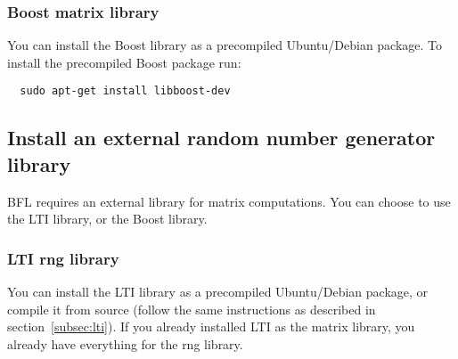 \documentclass[a4paper,10pt]{article}
\begin{document}
\subsubsection{Boost matrix library}
You can install the Boost library as a precompiled Ubuntu/Debian
package. To install the precompiled Boost package run:
\begin{verbatim}
  sudo apt-get install libboost-dev
\end{verbatim}








\subsection{Install an external random number generator library}
BFL requires an external library for matrix computations. You can
choose to use the LTI library, or the Boost library.

\subsubsection{LTI rng library}
You can install the LTI library as a precompiled Ubuntu/Debian
package, or compile it from source (follow the same instructions as
described in section~\ref{subsec:lti}). If you already installed LTI
as the matrix library, you already have everything for the rng library.
\end{document}

